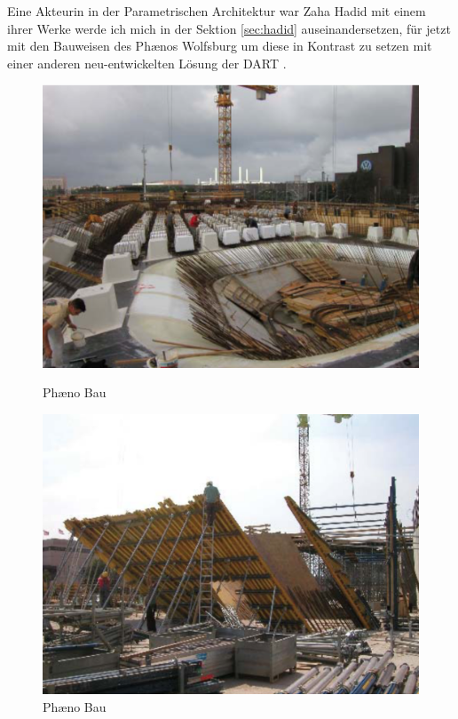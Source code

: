 \documentclass{article}
\begin{document}
Eine Akteurin in der Parametrischen Architektur war Zaha Hadid mit einem
ihrer Werke werde ich mich in der Sektion \ref{sec:hadid}
auseinandersetzen, f\"ur jetzt mit den Bauweisen des Ph\ae{}nos Wolfsburg
um diese in Kontrast zu setzen mit einer anderen neu-entwickelten L\"osung 
der DART \parencite{kahn2023}.
    \begin{figure}[H]
        \begin{minipage}{0.4\textwidth}
           \centering
           \vfill
           \includegraphics[width=\linewidth]{figures/beispiele/phaeno-307-1.png}
           \caption{Ph\ae{}no Bau \parencite{mayer}}
           \label{fig:bau-phae-1}
        \end{minipage}
            \hfill
        \begin{minipage}{0.4\textwidth}
           \centering
           \vfill
           \includegraphics[width=\linewidth]{figures/beispiele/phaeno-307-2.png}
           \caption{Ph\ae{}no Bau \parencite{mayer}}
           \label{fig:bau-phae-2}
        \end{minipage}
    \end{figure}
\end{document}
